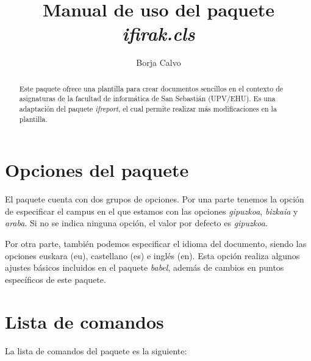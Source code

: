 \documentclass[eu]{ifirak}
\begin{document}


\title{Manual de uso del paquete \textit{ifirak.cls}}
\author{Borja Calvo}

\maketitle

\begin{abstract}
Este paquete ofrece una plantilla para crear documentos sencillos en el contexto de asignaturas de la facultad de inform\'atica de San Sebasti\'an (UPV/EHU). Es una adaptaci\'on del paquete \textit{ifreport}, el cual permite realizar m\'as modificaciones en la plantilla.
\end{abstract}

\section{Opciones del paquete}
El paquete cuenta con dos grupos de opciones. Por una parte tenemos la opci\'on de especificar el campus en el que estamos con las opciones \textit{gipuzkoa}, \textit{bizkaia} y \textit{araba}. Si no se indica ninguna opci\'on, el valor por defecto es \textit{gipuzkoa}.

Por otra parte, tambi\'en podemos especificar el idioma del documento, siendo las opciones euskara (eu), castellano (es) e ingl\'es (en). Esta opci\'on realiza algunos ajustes b\'asicos incluidos en el paquete \textit{babel}, adem\'as de cambios en puntos espec\'ificos de este paquete.

\section{Lista de comandos}

La lista de comandos del paquete es la siguiente:
\end{document}
